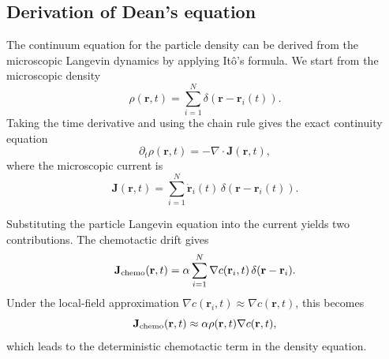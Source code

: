 \documentclass{article}
\begin{document}

\subsection{Derivation of Dean's equation}

The continuum equation for the particle density can be derived from the microscopic Langevin dynamics by applying It\^{o}'s formula. We start from the microscopic density
\begin{equation}
    \rho(\mathbf r,t) = \sum_{i=1}^{N}\delta(\mathbf r-\mathbf r_i(t)).
    \label{eq:microscopicDensity}
\end{equation}
Taking the time derivative and using the chain rule gives the exact continuity equation
\begin{equation}
    \partial_t\rho(\mathbf r,t) = -\nabla\cdot\mathbf J(\mathbf r,t),
\end{equation}
where the microscopic current is
\begin{equation}
    \mathbf J(\mathbf r,t) = \sum_{i=1}^{N}\dot{\mathbf r}_i(t)\,\delta(\mathbf r-\mathbf r_i(t)).
\end{equation}

Substituting the particle Langevin equation into the current yields two contributions. The chemotactic drift gives
\begin{equation}
    \mathbf J_{\rm chemo}(\mathbf r,t) = \alpha\sum_{i=1}^{N}\nabla c(\mathbf r_i,t)\,\delta(\mathbf r-\mathbf r_i).
\end{equation}
Under the local-field approximation $\nabla c(\mathbf r_i,t)\approx\nabla c(\mathbf r,t)$, this becomes
\begin{equation}
    \mathbf J_{\rm chemo}(\mathbf r,t) \approx \alpha\rho(\mathbf r,t)\nabla c(\mathbf r,t),
\end{equation}
which leads to the deterministic chemotactic term in the density equation.
\end{document}
